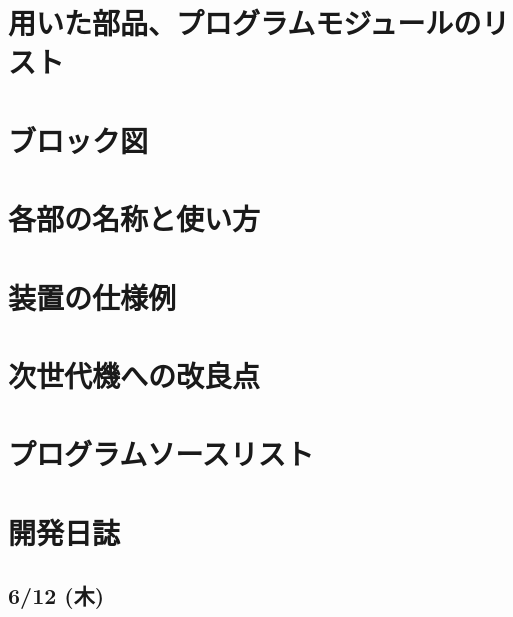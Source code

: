 \documentclass[uplatex,dvipdfmx,a4j,12pt]{jsarticle}
\begin{document}
\section{用いた部品、プログラムモジュールのリスト}

\section{ブロック図}

\section{各部の名称と使い方}

\section{装置の仕様例}

\section{次世代機への改良点}

\appendix

\section{プログラムソースリスト}

\section{開発日誌}
\subsection{6/12 (木)}
\end{document}
